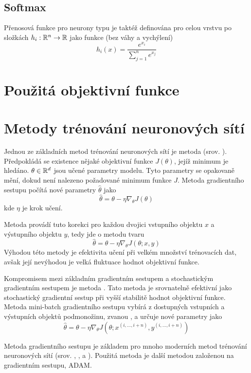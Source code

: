 \subsection{Softmax}
Přenosová funkce pro neurony typu  je taktéž definována pro celou vrstvu po složkách \( h_i : \mathbb R^n \to \mathbb R \) jako funkce (bez váhy a vychýlení)
\[ h_i \left( x \right) = \frac{e^{x_i}}{\sum_{j = 1}^n e^{x_j}} \]

\section{Použitá objektivní funkce}

\section{Metody trénování neuronových sítí}
Jednou ze základních metod trénování neuronových sítí je metoda  (srov. \cite{cauchy_methode_1847}). Předpokládá se existence nějaké objektivní funkce \( J \left( \theta \right) \), jejíž minimum je hledáno. \( \theta \in \mathbb R^d \) jsou učené parametry modelu. Tyto parametry se opakovaně mění, dokud není nalezeno požadované minimum funkce \( J \). Metoda gradientního sestupu počítá nové parametry \( \hat \theta \) jako
\[ \hat \theta = \theta - \eta \nabla_{\theta} J \left( \theta \right) \]
kde \( \eta \) je krok učení.

Metoda  provádí tuto korekci pro každou dvojici vstupního objektu \( x \) a výstupního objektu \( y \), tedy jde o metodu tvaru
\[ \hat \theta = \theta - \eta \nabla_{\theta} J \left( \theta; x, y \right) \]
Výhodou této metody je efektivita učení při velkém množství trénovacích dat, avšak její nevýhodou je velká fluktuace hodnot objektivní funkce.

Kompromisem mezi základním gradientním sestupem a stochastickým gradientním sestupem je metoda . Tato metoda je srovnatelně efektivní jako stochastický gradientní sestup při vyšší stabilitě hodnot objektivní funkce. Metoda mini-batch gradientního sestupu vybírá z dostupných vstupních a výstupních objektů podmonožinu, zvanou , a určuje nové parametry jako
\[ \hat \theta = \theta - \eta \nabla_{\theta} J \left( \theta; x^{\left( i, \dots, i + n \right)}, y^{\left( i, \dots, i + n \right)} \right) \]

Metoda gradientního sestupu je základem pro mnoho moderních metod trénování neuronových sítí (srov. \cite{duchi_adaptive_2011}, \cite{zeiler_adadelta:_2012}, \cite{tieleman_lecture_2012} a \cite{kingma_adam:_2014}). Použitá metoda je další metodou založenou na gradientním sestupu, ADAM.

